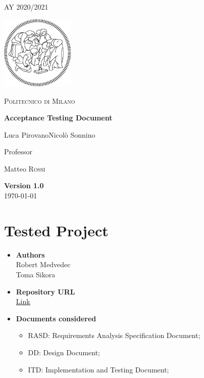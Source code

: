 \documentclass[table, 12pt]{article}
\begin{document}
\begin{titlepage}
    \centering
    {\scshape\large AY 2020/2021 \par}
    \vfill
    \includegraphics[width=100pt]{assets/logo-polimi-new}\par\vspace{1cm}
    {\scshape\LARGE Politecnico di Milano \par}
    \vspace{1.5cm}
    {\huge\bfseries Acceptance Testing Document \par}
    \vspace{2cm}
    {\Large {Luca Pirovano\quad Nicolò Sonnino}\par}
    \vfill
    {\large Professor\par
        Matteo \textsc{Rossi}}
    \vfill
    {\large \textbf{Version 1.0} \\ \today \par}
\end{titlepage}
\thispagestyle{plain}
\mbox{}
\newpage
{}
\tableofcontents
\newpage
{}

\section{Tested Project}
\begin{itemize}
    \item \textbf{Authors}\\Robert Medvedec\\Toma Sikora
    \item \textbf{Repository URL}\\ \underline{\href{https://github.com/robertodavinci/Software_Engineering_2_Project_Medvedec_Sikora}{Link}}
    \item \textbf{Documents considered}\begin{itemize}
              \item RASD: Requirements Analysis Specification Document;
              \item DD: Design Document;
              \item ITD: Implementation and Testing Document;
          \end{itemize}
\end{itemize}
\newpage
\end{document}
